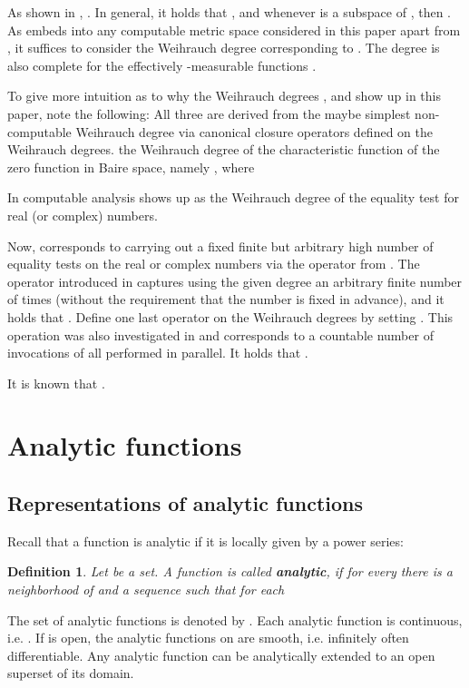 \documentclass{eptcs-modified}
\newtheorem{definition}[theorem]{Definition}
\newcommand{\demph}{\textbf}
\begin{document}
			As shown in \cite{MR2915694}, .
			In general, it holds that , and whenever  is a subspace of , then .
			As  embeds into any computable metric space considered in this paper apart from , it suffices to consider the Weihrauch degree  corresponding to .
			The degree  is also complete for the effectively -measurable functions \cite{MR2099383,pauly-descriptive}.

			To give more intuition as to why the Weihrauch degrees ,  and  show up in this paper, note the following:
			All three are derived from the maybe simplest non-computable Weihrauch degree  via canonical closure operators defined on the Weihrauch degrees.
			 the Weihrauch degree of the characteristic function of the zero function in Baire space, namely , where
			
			In computable analysis  shows up as the Weihrauch degree of the equality test for real (or complex) numbers.

			Now,  corresponds to carrying out a fixed finite but arbitrary high number of equality tests on the real or complex numbers via the operator  from \cite{paulyreducibilitylattice}.
			The operator  introduced in \cite{paulyneumann} captures using the given degree an arbitrary finite number of times (without the requirement that the number is fixed in advance), and it holds that .
			Define one last operator on the Weihrauch degrees by setting .
			This operation was also investigated in \cite{brattka2} and corresponds to a countable number of invocations of  all performed in parallel.
			It holds that .

			It is known that .

	\section{Analytic functions}\label{sec:analytic}
		\subsection{Representations of analytic functions}\label{sec:analytic functions}

			Recall that a function is analytic if it is locally given by a power series:
			\begin{definition}
				Let  be a set.
				A function  is called \demph{analytic}, if for every  there is a neighborhood  of  and a sequence  such that for each 
				
			\end{definition}
			The set of analytic functions is denoted by .
			Each analytic function is continuous, i.e. .
			If  is open, the analytic functions on  are smooth, i.e. infinitely often differentiable.
			Any analytic function can be analytically extended to an open superset of its domain.
\end{document}
